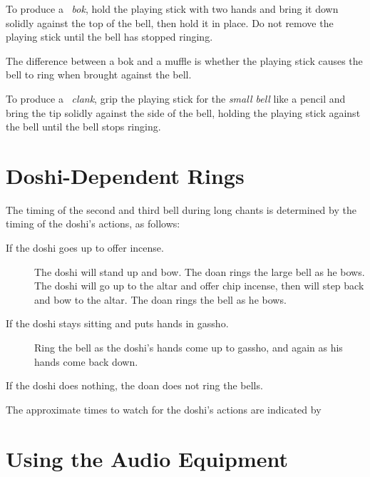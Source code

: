 \documentclass{kdo}
\begin{document}
To produce a \bok\ \emph{bok}, hold the playing stick with two hands and bring
it down solidly against the top of the bell, then hold it in place. Do not
remove the playing stick until the bell has stopped ringing.

The difference between a bok and a muffle is whether the playing stick causes
the bell to ring when brought against the bell.

To produce a \clank\ \emph{clank}, grip the playing stick for the \emph{small
bell} like a pencil and bring the tip solidly against the side of the bell,
holding the playing stick against the bell until the bell stops ringing.

\section*{Doshi-Dependent Rings}
The timing of the second and third bell during long chants is determined by the
timing of the doshi's actions, as follows:

\begin{description}
\item[If the doshi goes up to offer incense.] The doshi will stand up and bow.
The doan rings the large bell as he bows. The doshi will go up to the altar and
offer chip incense, then will step back and bow to the altar. The doan rings
the bell as he bows.
\item[If the doshi stays sitting and puts hands in gassho.] Ring the bell as
the doshi's hands come up to gassho, and again as his hands come back down.
\end{description}

If the doshi does nothing, the doan does not ring the bells.

The approximate times to watch for the doshi's actions are indicated by

\section*{Using the Audio Equipment}
\end{document}
